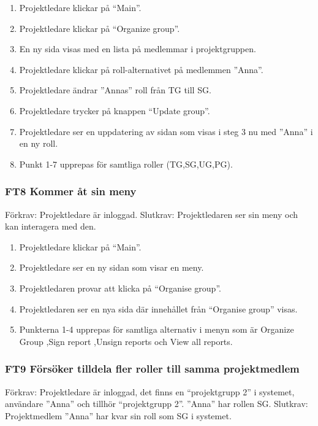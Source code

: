 \documentclass[paper=a4, fontsize=11pt,twoside]{article}
\begin{document}
	\begin{enumerate}
	\item Projektledare klickar på “Main”.
	\item Projektledare klickar på “Organize group”.
	\item En ny sida visas med en lista på medlemmar i projektgruppen.
	\item Projektledare klickar på roll-alternativet på medlemmen ”Anna”.
	\item Projektledare ändrar ”Annas” roll från TG till SG.
	\item Projektledare trycker på knappen “Update group”.
	\item Projektledare ser en uppdatering av sidan som visas i steg 3 nu med ”Anna”
	i en ny roll.
	\item Punkt 1-7 upprepas för samtliga roller (TG,SG,UG,PG).
	  
	\end{enumerate}
	
	\subsubsection*{FT8 Kommer åt sin meny}
	Förkrav: Projektledare är inloggad.
	\newline
	Slutkrav: Projektledaren ser sin meny och kan interagera med den.
	
	\begin{enumerate}
	  \item Projektledare klickar på “Main”.
	  \item Projektledare ser en ny sidan som visar en meny.
	  \item Projektledaren provar att klicka på “Organise group”.
      \item Projektledaren ser en nya sida där innehållet från “Organise group”
      visas. 
      \item Punkterna 1-4 upprepas för samtliga alternativ i menyn som är
      Organize Group ,Sign report ,Unsign reports och View all reports.
	\end{enumerate}
	
	\subsubsection*{FT9 Försöker tilldela fler roller till samma projektmedlem}
	
	Förkrav: Projektledare är inloggad, det finns en “projektgrupp 2” i systemet,
	användare  ”Anna” och tillhör “projektgrupp 2”. ”Anna” har rollen SG.
	\newline
	Slutkrav: Projektmedlem ”Anna” har kvar sin roll som SG i systemet.
	
\end{document}
